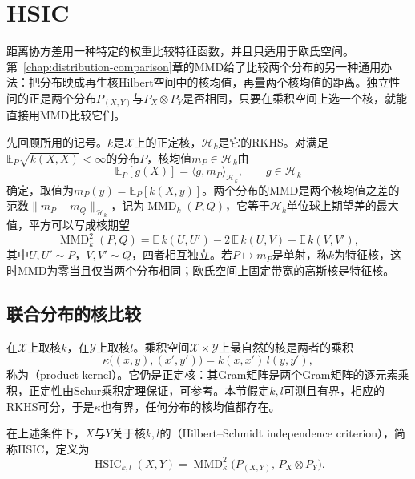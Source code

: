 \section{HSIC}
\label{sec:dep-hsic}

距离协方差用一种特定的权重比较特征函数，并且只适用于欧氏空间。第~\ref{chap:distribution-comparison}章的MMD给了比较两个分布的另一种通用办法：把分布映成再生核Hilbert空间中的核均值，再量两个核均值的距离。独立性问的正是两个分布$P_{(X,Y)}$与$P_X\otimes P_Y$是否相同，只要在乘积空间上选一个核，就能直接用MMD比较它们。

先回顾所用的记号。$k$是$\mathcal{X}$上的正定核，$\mathcal{H}_k$是它的RKHS。对满足$\mathbb{E}_{P}\sqrt{k(X,X)}<\infty$的分布$P$，核均值$m_P\in\mathcal{H}_k$由
\[
  \mathbb{E}_{P}[g(X)]=\langle g,m_P\rangle_{\mathcal{H}_k},\qquad g\in\mathcal{H}_k
\]
确定，取值为$m_P(y)=\mathbb{E}_{P}[k(X,y)]$。两个分布的MMD是两个核均值之差的范数$\lVert m_P-m_Q\rVert_{\mathcal{H}_k}$，记为$\operatorname{MMD}_k(P,Q)$，它等于$\mathcal{H}_k$单位球上期望差的最大值，平方可以写成核期望
\begin{equation}
  \operatorname{MMD}_k^{2}(P,Q)=\mathbb{E}\,k(U,U')-2\,\mathbb{E}\,k(U,V)+\mathbb{E}\,k(V,V'),
  \label{eq:dep-mmd-recall}
\end{equation}
其中$U,U'\sim P$，$V,V'\sim Q$，四者相互独立。若$P\mapsto m_P$是单射，称$k$为特征核，这时MMD为零当且仅当两个分布相同；欧氏空间上固定带宽的高斯核是特征核。

\subsection{联合分布的核比较}
\label{sec:dep-hsic-kernel-comparison}

在$\mathcal{X}$上取核$k$，在$\mathcal{Y}$上取核$l$。乘积空间$\mathcal{X}\times\mathcal{Y}$上最自然的核是两者的乘积
\[
  \kappa\bigl((x,y),(x',y')\bigr)=k(x,x')\,l(y,y'),
\]
称为（product kernel）。它仍是正定核：其Gram矩阵是两个Gram矩阵的逐元素乘积，正定性由Schur乘积定理保证，可参考。本节假定$k,l$可测且有界，相应的RKHS可分，于是$\kappa$也有界，任何分布的核均值都存在。

\begin{definition}[HSIC]
\label{def:dep-hsic}
在上述条件下，$X$与$Y$关于核$k,l$的（Hilbert--Schmidt independence criterion），简称HSIC，定义为
\begin{equation}
  \operatorname{HSIC}_{k,l}(X,Y)=\operatorname{MMD}_{\kappa}^{2}\bigl(P_{(X,Y)},\,P_X\otimes P_Y\bigr).
  \label{eq:dep-hsic-def}
\end{equation}
\end{definition}

